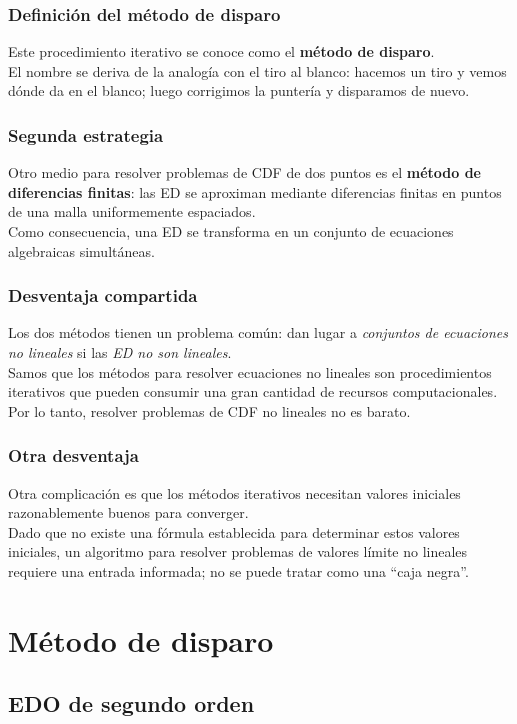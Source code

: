 \documentclass[12pt]{beamer}
\begin{document}
\begin{frame}
\frametitle{Definición del método de disparo}
Este procedimiento iterativo se conoce como el \textbf{\textcolor{brickred}{método de disparo}}.
\\
\bigskip
\pause
El nombre se deriva de la analogía con el tiro al blanco: \pause hacemos un tiro y vemos dónde da en el blanco; luego corrigimos la puntería y disparamos de nuevo.
\end{frame}
\begin{frame}
\frametitle{Segunda estrategia}
Otro medio para resolver problemas de CDF de dos puntos es el \textbf{\textcolor{chamoisee}{método de diferencias finitas}}: \pause  las ED se aproximan mediante diferencias finitas en puntos de una malla uniformemente espaciados.
\\
\bigskip
\pause
Como consecuencia, una ED se transforma en un conjunto de ecuaciones algebraicas simultáneas.
\end{frame}
\begin{frame}
\frametitle{Desventaja compartida}
Los dos métodos tienen un problema común: dan lugar a \emph{conjuntos de ecuaciones no lineales} si \pause las \emph{ED no son lineales}.
\\
\bigskip
\pause
Samos que los métodos para resolver ecuaciones no lineales son procedimientos iterativos que pueden consumir una gran cantidad de recursos computacionales. \pause Por lo tanto, resolver problemas de CDF no lineales no es barato.
\end{frame}
\begin{frame}
\frametitle{Otra desventaja}
Otra complicación es que los métodos iterativos necesitan valores iniciales razonablemente buenos para converger.
\\
\bigskip
\pause
Dado que no existe una fórmula establecida para determinar estos valores iniciales, un algoritmo para resolver problemas de valores límite no lineales requiere una entrada informada; no se puede tratar como una \enquote{caja negra}.
\end{frame}

\section{Método de disparo}
\subsection{EDO de segundo orden}
\end{document}
